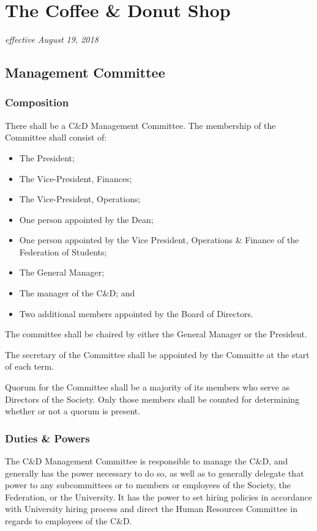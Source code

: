 \section{The Coffee \& Donut Shop}
\emph{effective August 19, 2018}\\

\subsection{Management Committee}
\subsubsection{Composition}
There shall be a C\&D Management Committee. The membership of the Committee shall
consist of:
\begin{itemize}
    \item The President;
    \item The Vice-President, Finances;
    \item The Vice-President, Operations;
    \item One person appointed by the Dean;
    \item One person appointed by the Vice President, Operations \& Finance of
        the Federation of Students; 
    \item The General Manager;
    \item The manager of the C\&D; and
    \item Two additional members appointed by the Board of Directors.
\end{itemize}

The committee shall be chaired by either the General Manager or the President.

The secretary of the Committee shall be appointed by the Committe at the start
of each term.

Quorum for the Committee shall be a majority of its members who serve as
Directors of the Society. Only those members shall be counted for determining
whether or not a quorum is present.

\subsubsection{Duties \& Powers}
The C\&D Management Committee is responsible to manage the C\&D, and generally
has the power necessary to do so, as well as to generally delegate that power
to any subcommittees or to members or employees of the Society, the Federation,
or the University. It has the power to set hiring policies in accordance with
University hiring process and direct the Human Resources Committee in regards
to employees of the C\&D.

